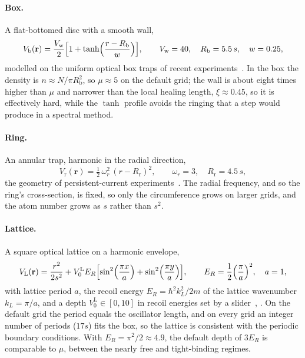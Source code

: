\documentclass[11pt,a4paper]{article}
\begin{document}
\paragraph{Box.} A flat-bottomed disc with a smooth wall,
\begin{equation}
V_{\mathrm{b}}(\mathbf r)=\frac{V_{\mathrm{w}}}{2}\Bigl[1+\tanh\Bigl(\frac{r-R_{\mathrm b}}{w}\Bigr)\Bigr],\qquad V_{\mathrm w}=40,\quad R_{\mathrm b}=5.5\,s,\quad w=0.25,
\end{equation}
modelled on the uniform optical box traps of recent experiments~\cite{gaunt}. In the box the density is $n\approx N/\pi R_{\mathrm b}^2$, so $\mu\approx5$ on the default grid; the wall is about eight times higher than $\mu$ and narrower than the local healing length, $\xi\approx0.45$, so it is effectively hard, while the $\tanh$ profile avoids the ringing that a step would produce in a spectral method.

\paragraph{Ring.} An annular trap, harmonic in the radial direction,
\begin{equation}
V_{\mathrm{r}}(\mathbf r)=\tfrac12\,\omega_r^2\,(r-R_{\mathrm r})^2,\qquad \omega_r=3,\quad R_{\mathrm r}=4.5\,s,
\end{equation}
the geometry of persistent-current experiments~\cite{ramanathan}. The radial frequency, and so the ring's cross-section, is fixed, so only the circumference grows on larger grids, and the atom number grows as $s$ rather than $s^2$.

\paragraph{Lattice.} A square optical lattice on a harmonic envelope,
\begin{equation}
V_{\mathrm{L}}(\mathbf r)=\frac{r^2}{2s^2}+V_0^{\mathrm L}E_R\Bigl[\sin^2\Bigl(\frac{\pi x}{a}\Bigr)+\sin^2\Bigl(\frac{\pi y}{a}\Bigr)\Bigr],\qquad E_R=\frac12\Bigl(\frac{\pi}{a}\Bigr)^2,\quad a=1,
\end{equation}
with lattice period $a$, the recoil energy $E_R=\hbar^2k_L^2/2m$ of the lattice wavenumber $k_L=\pi/a$, and a depth $V_0^{\mathrm L}\in[0,10]$ in recoil energies set by a slider~\cite[\S3.9.3]{bbp}, \cite{morsch}. On the default grid the period equals the oscillator length, and on every grid an integer number of periods ($17s$) fits the box, so the lattice is consistent with the periodic boundary conditions. With $E_R=\pi^2/2\approx4.9$, the default depth of $3E_R$ is comparable to $\mu$, between the nearly free and tight-binding regimes.
\end{document}
